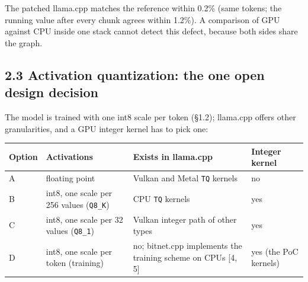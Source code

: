 \documentclass[
  10pt,
]{article}
\newcounter{none} %
\begin{document}
The patched llama.cpp matches the reference within 0.2\% (same tokens;
the running value after every chunk agrees within 1.2\%). A comparison
of GPU against CPU inside one stack cannot detect this defect, because
both sides share the graph.

\subsection{2.3 Activation quantization: the one open design
decision}\label{activation-quantization-the-one-open-design-decision}

The model is trained with one int8 scale per token (\S{}1.2); llama.cpp
offers other granularities, and a GPU integer kernel has to pick one:

{\def\LTcaptype{none} %
\begin{longtable}[]{@{}
  >{\raggedright\arraybackslash}p{}
  >{\raggedright\arraybackslash}p{}
  >{\raggedright\arraybackslash}p{}
  >{\raggedright\arraybackslash}p{}@{}}
\toprule\noalign{}
\begin{minipage}[b]{\linewidth}\raggedright%
Option
\end{minipage} & \begin{minipage}[b]{\linewidth}\raggedright%
Activations
\end{minipage} & \begin{minipage}[b]{\linewidth}\raggedright%
Exists in llama.cpp
\end{minipage} & \begin{minipage}[b]{\linewidth}\raggedright%
Integer kernel
\end{minipage} \\
\midrule\noalign{}
\endhead%
\bottomrule\noalign{}
\endlastfoot%
A & floating point & Vulkan and Metal \texttt{TQ} kernels & no \\
B & int8, one scale per 256 values (\texttt{Q8\_K}) & CPU \texttt{TQ}
kernels & yes \\
C & int8, one scale per 32 values (\texttt{Q8\_1}) & Vulkan integer path
of other types & yes \\
D & int8, one scale per token (training) & no; bitnet.cpp implements the
training scheme on CPUs [4, 5] & yes (the PoC kernels) \\
\end{longtable}
}
\end{document}
